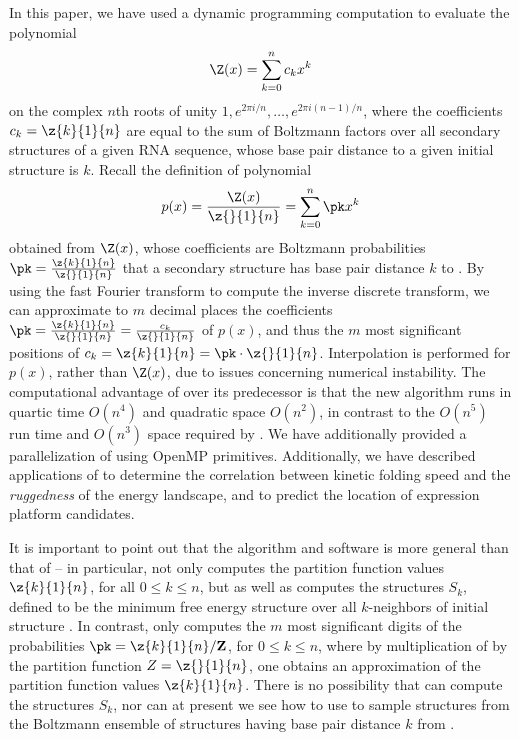In this paper, we have used a dynamic programming computation to
evaluate the polynomial
\begin{eqnarray}
\Z(x) = \sum_{k=0}^n c_k x^k
\end{eqnarray}
on the complex $n$th roots of unity $1,e^{2 \pi i/n},\ldots,
e^{2 \pi i (n-1)/n}$,
where the coefficients $c_k=\z{k}{1}{n}$ are equal to the sum of
Boltzmann factors over all secondary structures of a given RNA
sequence, whose base pair distance to a given initial structure \strSt
is $k$.  Recall the definition of polynomial
\begin{eqnarray}
p(x) = \frac{\Z(x)}{\z{}{1}{n}} = \sum_{k=0}^n \pk x^k
\end{eqnarray}
obtained from $\Z(x)$, whose coefficients are Boltzmann
probabilities $\pk=\frac{\z{k}{1}{n}}{\z{}{1}{n}}$ that a secondary
structure has base pair distance $k$ to \strSt.
By using the fast Fourier transform to compute the inverse
discrete transform, we can approximate  to $m$ decimal places the coefficients
$\pk=\frac{\z{k}{1}{n}}{\z{}{1}{n}} =\frac{c_k}{\z{}{1}{n}}$ of $p(x)$, and
thus the $m$ most significant positions of
$c_k=\z{k}{1}{n}=\pk \cdot \z{}{1}{n}$. Interpolation is performed for
$p(x)$, rather than $\Z(x)$, due to issues concerning numerical instability.
The computational advantage of \fftbor over its predecessor
\rnabor \citep{freyhult.b07} is that
the new algorithm runs in quartic time $O(n^4)$ and quadratic space
$O(n^2)$, in contrast to the $O(n^5)$ run time and $O(n^3)$ space
required by \rnabor. We have additionally provided a
parallelization of \fftbor using OpenMP primitives.
Additionally, we have
described applications of \fftbor to determine the
correlation between kinetic folding speed and the {\em ruggedness}
of the energy landscape, and to predict the location of \rb
expression platform candidates.

It is important to point out that
the algorithm and software \rnabor is more general than
that of \fftbor -- in particular, \rnabor not only computes the
partition function values $\z{k}{1}{n}$, for all $0 \leq k \leq n$, but as
well as computes the
structures $S_k$, defined to be the minimum free energy structure over all
$k$-neighbors of initial structure \strSt.
In contrast, \fftbor only computes the $m$ most significant digits of
the probabilities $\pk = \z{k}{1}{n}/{\bf Z}$, for $0 \leq k \leq n$, where
by multiplication of \pk by the partition function $Z=\z{}{1}{n}$,
one obtains an approximation of the partition function values $\z{k}{1}{n}$.
There is no possibility that \fftbor can compute the structures $S_k$,
nor can at present we see how to use \fftbor to sample structures from
the Boltzmann ensemble of structures having base pair distance $k$ from \strSt.

